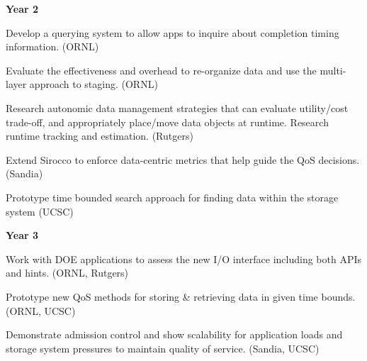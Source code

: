 \textbf{Year 2}
\begin{tightItemize}
\item Develop a querying system to allow apps to inquire
about completion timing information. (ORNL)
\item Evaluate the effectiveness and overhead to re-organize data and use the multi-layer approach 
to staging. (ORNL)
\item Research autonomic data management strategies that
can evaluate utility/cost trade-off, and appropriately place/move data objects at runtime. 
Research runtime tracking and estimation. (Rutgers)
\item Extend Sirocco to enforce data-centric metrics that help guide the QoS decisions. (Sandia)
\item Prototype time bounded search approach for finding data within the storage system (UCSC)
\end{tightItemize}
\textbf{Year 3}
\begin{tightItemize}
\item Work with DOE applications to assess 
the new I/O interface including both APIs and hints. (ORNL, Rutgers)
\item Prototype new QoS methods for storing \& retrieving data in given time bounds. (ORNL, UCSC)
\item Demonstrate admission control and show scalability for  application loads and 
 storage system pressures to maintain quality of
service. (Sandia, UCSC)
\end{tightItemize}
\normalsize

